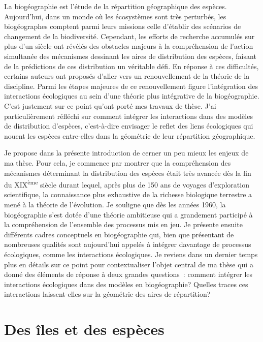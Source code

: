La biogéographie est l'étude de la répartition géographique des espèces.
Aujourd'hui, dans un monde où les écosystèmes sont très perturbés, les
biogéographes comptent parmi leurs missions celle d'établir des
scénarios de changement de la biodiversité. Cependant, les efforts de
recherche accumulés sur plus d'un siècle ont révélés des obstacles
majeurs à la compréhension de l'action simultanée des mécanismes
dessinant les aires de distribution des espèces, faisant de la
prédictions de ces distribution un véritable défi. En réponse à ces
difficultés, certains auteurs ont proposés d'aller vers un
renouvellement de la théorie de la discipline. Parmi les étapes majeures
de ce renouvellement figure l'intégration des interactions écologiques
au sein d'une théorie plus intégrative de la biogéographie. C'est
justement sur ce point qu'ont porté mes travaux de thèse. J'ai
particulièrement réfléchi sur comment intégrer les interactions dans des
modèles de distribution d'espèces, c'est-à-dire envisager le reflet des
liens écologiques qui nouent les espèces entre-elles dans la géométrie
de leur répartition géographique.

Je propose dans la présente introduction de cerner un peu mieux les
enjeux de ma thèse. Pour cela, je commence par montrer que la
compréhension des mécanismes déterminant la distribution des espèces
était très avancée dès la fin du XIX\textsuperscript{ème} siècle durant
lequel, après plus de 150 ans de voyages d'exploration scientifique, la
connaissance plus exhaustive de la richesse biologique terrestre a mené
à la théorie de l'évolution. Je souligne que dès les années 1960, la
biogéographie s'est dotée d'une théorie ambitieuse qui a grandement
participé à la compréhension de l'ensemble des processus mis en jeu. Je
présente ensuite différents cadres conceptuels en biogéographie qui,
bien que présentant de nombreuses qualités sont aujourd'hui appelés à
intégrer davantage de processus écologiques, comme les interactions
écologiques. Je reviens dans un dernier temps plus en détails sur ce
point pour contextualiser l'objet central de ma thèse qui a donné des
éléments de réponse à deux grandes questions~: comment intégrer les
interactions écologiques dans des modèles en biogéographie? Quelles
traces ces interactions laissent-elles sur la géométrie des aires de
répartition?

\section*{Des îles et des espèces}\label{des-uxeeles-et-des-espuxe8ces}

